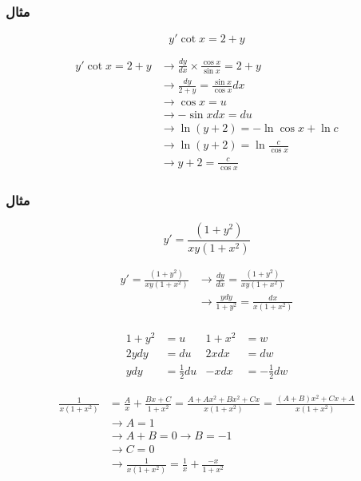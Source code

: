\documentclass[12pt]{book}
\begin{document}
\subsubsection{مثال}

$$
y' \cot{x} = 2 + y
$$

\begin{align*}
y' \cot{x} = 2 + y &\to \frac{dy}{dx} \times \frac{\cos{x}}{\sin{x}} = 2 + y \\
&\to \frac{dy}{2+y} = \frac{\sin{x}}{\cos{x}} dx \\
&\to \cos{x} = u \\
&\to - \sin{x} dx = du \\
&\to \ln{(y+2)} = - \ln{\cos{x}} + \ln{c} \\
&\to \ln{(y+2)} = \ln{\frac{c}{\cos{x}}} \\
&\to y + 2 = \frac{c}{\cos{x}}
\end{align*}


\subsubsection{مثال}

$$
y' = \frac{(1+y^{2})}{xy(1+x^{2})}
$$


\begin{align*}
y' = \frac{(1+y^{2})}{xy(1+x^{2})} &\to \frac{dy}{dx} = \frac{(1+y^{2})}{xy(1+x^{2})} \\
&\to \frac{ydy}{1+y^{2}} = \frac{dx}{x(1+x^{2})} \\
\end{align*}

\begin{align*}
1 + y^{2} &= u & 1 + x^{2} &= w \\
2ydy &= du & 2xdx &= dw \\
ydy &= \frac{1}{2} du & -xdx &= - \frac{1}{2} dw
\end{align*}



\begin{align*}
\frac{1}{x(1+x^{2})} &= \frac{A}{x} + \frac{Bx+C}{1+x^{2}} = \frac{A + Ax^{2} + Bx^{2} + Cx}{x(1+x^{2})} = \frac{(A+B)x^{2} + Cx + A}{x(1+x^{2})} \\
&\to A = 1 \\
&\to A + B = 0 \to B = -1 \\ 
&\to C = 0 \\
&\to \frac{1}{x(1+x^{2})} = \frac{1}{x} + \frac{-x}{1+x^{2}} \\
\end{align*}
\end{document}
